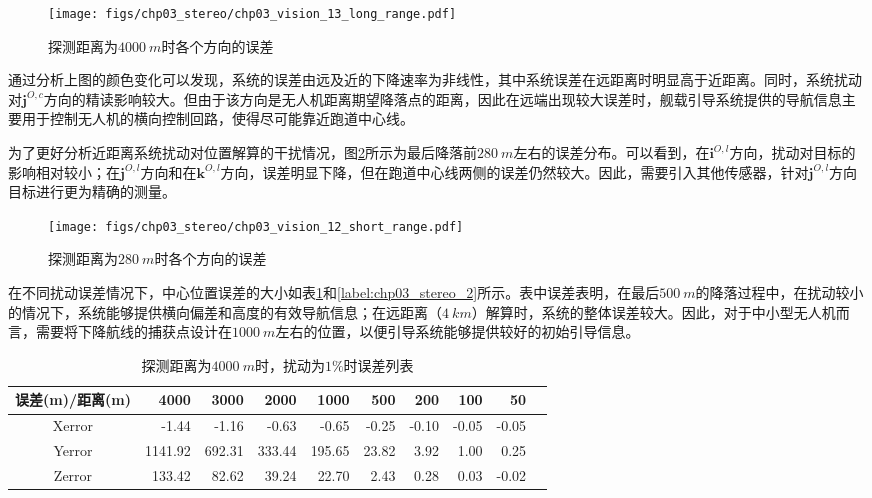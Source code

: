 \begin{figure}[htb]
\centering
\texttt{[image: figs/chp03\_stereo/chp03\_vision\_13\_long\_range.pdf]}	
\caption{探测距离为$4000\ m$时各个方向的误差}
\label{fig:chp03_vision_13_long_range}
\end{figure}
通过分析上图的颜色变化可以发现，系统的误差由远及近的下降速率为非线性，其中系统误差在远距离时明显高于近距离。同时，系统扰动对$\mathbf{j}^{O,c}$方向的精读影响较大。但由于该方向是无人机距离期望降落点的距离，因此在远端出现较大误差时，舰载引导系统提供的导航信息主要用于控制无人机的横向控制回路，使得尽可能靠近跑道中心线。

为了更好分析近距离系统扰动对位置解算的干扰情况，图\ref{fig:chp03_vision_12_short_range}所示为最后降落前$280\ m$左右的误差分布。可以看到，在$\mathbf{i}^{O,l}$方向，扰动对目标的影响相对较小；在$\mathbf{j}^{O,l}$方向和在$\mathbf{k}^{O,l}$方向，误差明显下降，但在跑道中心线两侧的误差仍然较大。因此，需要引入其他传感器，针对$\mathbf{j}^{O,l}$方向目标进行更为精确的测量。

\begin{figure}[htb]
	\centering
	\texttt{[image: figs/chp03\_stereo/chp03\_vision\_12\_short\_range.pdf]}	
	\caption{探测距离为$280\ m$时各个方向的误差}
	\label{fig:chp03_vision_12_short_range}
\end{figure}


在不同扰动误差情况下，中心位置误差的大小如表\ref{label:chp03_stereo_1}和\ref{label:chp03_stereo_2}所示。表中误差表明，在最后$500\ m$的降落过程中，在扰动较小的情况下，系统能够提供横向偏差和高度的有效导航信息；在远距离（$4\ km$）解算时，系统的整体误差较大。因此，对于中小型无人机而言，需要将下降航线的捕获点设计在$1000\ m$左右的位置，以便引导系统能够提供较好的初始引导信息。
\begin{table}[htb]
	\centering
	\caption{探测距离为$4000\ m$时，扰动为$1\%$时误差列表}
	\label{label:chp03_stereo_1}
	\begin{tabular}{crrrrrrrrr}
		\hline
		误差(m)/距离(m)     & 4000    & 3000   & 2000     & 1000  & 500   & 200   & 100   & 50     \\ \hline
		Xerror  & -1.44   & -1.16  & -0.63  & -0.65   & -0.25 & -0.10 & -0.05 & -0.05\\ 
		Yerror  & 1141.92 & 692.31 & 333.44 & 195.65  & 23.82 & 3.92  & 1.00  & 0.25   \\
		Zerror  & 133.42  & 82.62  & 39.24  & 22.70   & 2.43  & 0.28  & 0.03  & -0.02  \\ \hline
		
	\end{tabular}
\end{table}

